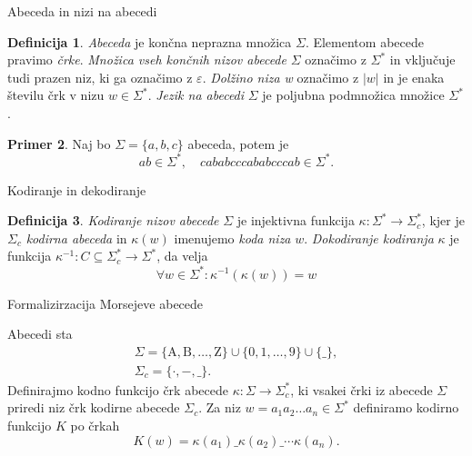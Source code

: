 \documentclass{beamer}
\theoremstyle{definition} %
\newtheorem{definicija}{Definicija}[section]
\newtheorem{primer}[definicija]{Primer}
\theoremstyle{plain} %
\begin{document}
\begin{frame}{Abeceda in nizi na abecedi}
    
    \begin{definicija}

        \textit{Abeceda} je končna neprazna množica $ \Sigma $. Elementom abecede pravimo \textit{črke}.
        \textit{Množica vseh končnih nizov abecede} $ \Sigma $ označimo z $ \Sigma^* $ in vključuje tudi
        prazen niz, ki ga označimo z $ \varepsilon $. \textit{Dolžino niza w} označimo z $ |w| $ in je 
        enaka številu črk v nizu $ w \in \Sigma^* $. \textit{Jezik na abecedi} $ \Sigma $ je poljubna
        podmnožica množice $ \Sigma^* $. 
    
    \end{definicija}

    \pause
    
    \begin{primer}

    Naj bo $ \Sigma = \{ a,b,c \} $ abeceda, potem je
    \[ 
        ab \in \Sigma^* , \quad cababcccababcccab \in \Sigma^*.
    \]

    \end{primer}

\end{frame}

\begin{frame}{Kodiranje in dekodiranje}
    
    \begin{definicija}
    
        \textit{Kodiranje nizov abecede} $ \Sigma $ je injektivna funkcija $ \kappa \colon \Sigma^* 
        \to \Sigma_c^* $, kjer je $ \Sigma_c $ \textit{kodirna abeceda} in $ \kappa(w) $ imenujemo
        \textit{koda niza} $ w $. \textit{Dokodiranje kodiranja} $ \kappa $ je funkcija 
        $ \kappa^{-1} \colon C \subseteq \Sigma^*_c \to \Sigma^* $, da velja
        \[
            \forall w \in \Sigma^* \colon \kappa^{-1}(\kappa(w)) = w
        \]
    
    \end{definicija}

\end{frame}

\begin{frame}{Formalizirzacija Morsejeve abecede}

    Abecedi sta
    \begin{gather*}
        \Sigma = \{ \text{A},  \text{B}, \ldots, \text{Z} \} \cup \{ 0, 1, \ldots, 9 \} \cup \{ \_ \}, \\
        \Sigma_c = \{ \cdot ,-, \_ \}.
    \end{gather*}
    Definirajmo kodno funkcijo črk abecede $ \kappa \colon \Sigma \to \Sigma_c^* $, ki vsakei črki iz abecede
    $ \Sigma $ priredi niz črk kodirne abecede $ \Sigma_c $. Za niz $ w = a_1a_2 \ldots a_n \in \Sigma^* $
    definiramo kodirno funkcijo $ K $ po črkah
    \[
        K(w) = \kappa(a_1)\_\kappa(a_2)\_\cdots\kappa(a_n).
    \]

\end{frame}
\end{document}
